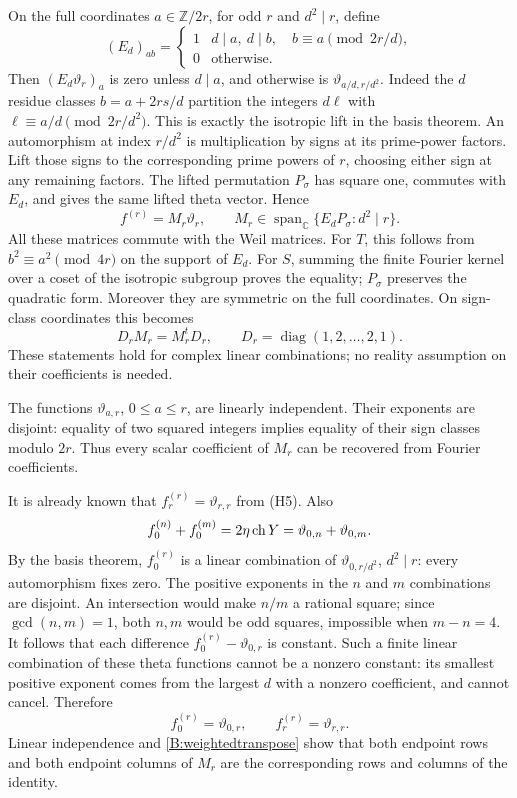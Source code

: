 \documentclass[11pt]{article}
\newcommand{\C}{\mathbb C}\newcommand{\Q}{\mathbb Q}\newcommand{\Z}{\mathbb Z}
\numberwithin{equation}{section}
\begin{document}
On the full coordinates $a\in\Z/2r$, for odd $r$ and $d^2\mid r$, define
\[
 (E_d)_{ab}=
 \begin{cases}1&d\mid a,\ d\mid b,\quad b\equiv a\pmod{2r/d},\\
 0&\text{otherwise}.
 \end{cases}
\]
Then $(E_d\vartheta_r)_a$ is zero unless $d\mid a$, and otherwise is
$\vartheta_{a/d,r/d^2}$. Indeed the $d$ residue classes $b=a+2rs/d$ partition the integers $d\ell$ with $\ell\equiv a/d\pmod{2r/d^2}$. This is exactly the isotropic lift in the basis theorem. An automorphism at index $r/d^2$ is multiplication by signs at its prime-power factors. Lift those signs to the corresponding prime powers of $r$, choosing either sign at any remaining factors. The lifted permutation $P_\sigma$ has square one, commutes with $E_d$, and gives the same lifted theta vector. Hence
\begin{equation}\label{B:thetaM}
 f^{(r)}=M_r\vartheta_r,\qquad
 M_r\in\operatorname{span}_{\C}\{E_dP_\sigma:d^2\mid r\}.
\end{equation}
All these matrices commute with the Weil matrices. For $T$, this follows from
$b^2\equiv a^2\pmod{4r}$ on the support of $E_d$. For $S$, summing the finite Fourier kernel over a coset of the isotropic subgroup proves the equality; $P_\sigma$ preserves the quadratic form. Moreover they are symmetric on the full coordinates. On sign-class coordinates this becomes
\begin{equation}\label{B:weightedtranspose}
 D_rM_r=M_r^tD_r,\qquad
 D_r=\operatorname{diag}(1,2,\ldots,2,1).
\end{equation}
These statements hold for complex linear combinations; no reality assumption on their coefficients is needed.

The functions $\vartheta_{a,r}$, $0\leq a\leq r$, are linearly independent. Their exponents are disjoint: equality of two squared integers implies equality of their sign classes modulo $2r$. Thus every scalar coefficient of $M_r$ can be recovered from Fourier coefficients.

It is already known that $f^{(r)}_r=\vartheta_{r,r}$ from (H5). Also
\[
 f^{(n)}_0+f^{(m)}_0=2\eta\operatorname{ch} Y=\vartheta_{0,n}+\vartheta_{0,m}.
\]
By the basis theorem, $f^{(r)}_0$ is a linear combination of
$\vartheta_{0,r/d^2}$, $d^2\mid r$: every automorphism fixes zero.
The positive exponents in the $n$ and $m$ combinations are disjoint. An intersection would make $n/m$ a rational square; since $\gcd(n,m)=1$, both $n,m$ would be odd squares, impossible when $m-n=4$. It follows that each difference $f^{(r)}_0-\vartheta_{0,r}$ is constant. Such a finite linear combination of these theta functions cannot be a nonzero constant: its smallest positive exponent comes from the largest $d$ with a nonzero coefficient, and cannot cancel. Therefore
\begin{equation}\label{B:endpoints}
 f^{(r)}_0=\vartheta_{0,r},\qquad f^{(r)}_r=\vartheta_{r,r}.
\end{equation}
Linear independence and \eqref{B:weightedtranspose} show that both endpoint rows and both endpoint columns of $M_r$ are the corresponding rows and columns of the identity.
\end{document}
